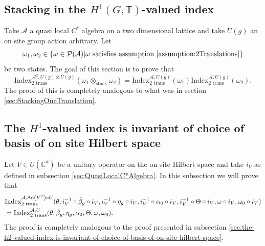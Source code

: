 \documentclass[12pt,a4paper,twoside]{article}
\let\originalleft\left
\let\originalright\right
\renewcommand{\left}{\mathopen{}\mathclose\bgroup\originalleft}
\renewcommand{\right}{\aftergroup\egroup\originalright}
\newcommand{\PP}{\mathcal P}
\newcommand{\CC}{\mathbb C}
\newcommand{\TT}{\mathbb T}
\renewcommand{\AA}{\mathcal A}
\newcommand{\Ad}[1]{\textrm{Ad}\left(#1\right)}
\theoremstyle{definition}
\numberwithin{equation}{section}
\begin{document}
\subsection{Stacking in the $H^1(G,\TT)$-valued index}\label{sec:StackingTwoTranslations}
Take $\AA$ a quasi local $C^*$ algebra on a two dimensional lattice and take $U(g)$ an on site group action arbitrary. Let
\begin{equation}
	\omega_1,\omega_2\in\{\omega\in\PP(\AA)| \omega\text{ satisfies assumption \ref{assumption:2Translations}}\}
\end{equation}
be two states. The goal of this section is to prove that
\begin{equation}\label{eq:IndexMorphismUnderStackingTwoTranslations}
	\textrm{Index}^{\AA^2,U(g)\otimes U(g)}_{\text{2 trans}}(\omega_1\otimes_{\text{stack}}\omega_2)=\textrm{Index}^{\AA,U(g)}_{\text{2 trans}}(\omega_1)\textrm{Index}^{\AA,U(g)}_{\text{2 trans}}(\omega_2).
\end{equation}
The proof of this is completely analogous to what was in section \ref{sec:StackingOneTranslation}.
\subsection{The $H^1$-valued index is invariant of choice of basis of on site Hilbert space}
Let $V \in U(\CC^d)$ be a unitary operator on the on site Hilbert space and take $i_V$ as defined in subsection \ref{sec:QuasiLocalC*Algebra}. In this subsection we will prove that
\begin{align}
	&\textrm{Index}^{\AA,\Ad{V^\dagger}\circ U}_{2\text{ trans}}(\theta,i_V^{-1}\circ\tilde{\beta}_g\circ i_V,i_V^{-1}\circ\eta_g\circ i_V,i_V^{-1}\circ\alpha_0\circ i_V,i_V^{-1}\circ\Theta\circ i_V,\omega\circ i_V,\omega_0\circ i_V)\\
	&=\textrm{Index}^{\AA,U}_{2\text{ trans}}(\theta,\tilde{\beta}_g,\eta_g,\alpha_0,\Theta,\omega,\omega_0).
\end{align}
The proof is completely analogous to the proof presented in subsection \ref{sec:the-h2-valued-index-is-invariant-of-choice-of-basis-of-on-site-hilbert-space}.
\end{document}
